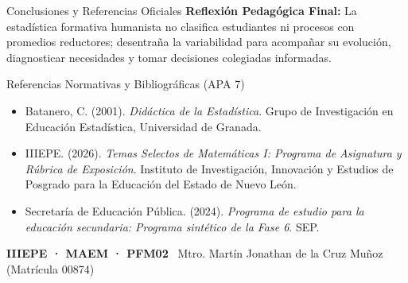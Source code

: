 \documentclass[
	spanish,
	aspectratio=169,
	xcolor={dvipsnames,table}
]{beamer}
\begin{document}
\begin{frame}{Conclusiones y Referencias Oficiales}
\small
\textbf{Reflexión Pedagógica Final:} La estadística formativa humanista no clasifica estudiantes ni procesos con promedios reductores; desentraña la variabilidad para acompañar su evolución, diagnosticar necesidades y tomar decisiones colegiadas informadas.
\vspace{0.25cm}
\begin{block}{Referencias Normativas y Bibliográficas (APA 7)}
	\footnotesize
	\begin{itemize}\setlength{\itemsep}{0.08cm}
		\item Batanero, C. (2001). \textit{Didáctica de la Estadística}. Grupo de Investigación en Educación Estadística, Universidad de Granada.
		\item IIIEPE. (2026). \textit{Temas Selectos de Matemáticas I: Programa de Asignatura y Rúbrica de Exposición}. Instituto de Investigación, Innovación y Estudios de Posgrado para la Educación del Estado de Nuevo León.
		\item Secretaría de Educación Pública. (2024). \textit{Programa de estudio para la educación secundaria: Programa sintético de la Fase 6}. SEP.
	\end{itemize}
\end{block}
\vspace{0.15cm}
\centering \scriptsize \textcolor{iiiepeNavy}{\textbf{IIIEPE · MAEM · PFM02} \textbar\ Mtro. Martín Jonathan de la Cruz Muñoz (Matrícula 00874)}
\end{frame}
\end{document}
